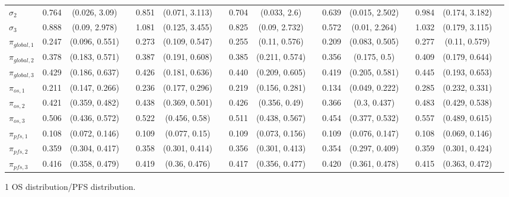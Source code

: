 \documentclass[AMA,STIX1COL]{WileyNJD-v2}
\begin{document}
\begin{landscape}
\begin{center}
\begin{table}[t]
\begin{tabular}{l c c c c c c c c c c c c c c c}
$\sigma_2$ & 0.764 & (0.026, 3.09) &  & 0.851 & (0.071, 3.113) &  & 0.704 & (0.033, 2.6) &  & 0.639 & (0.015, 2.502) &  & 0.984 & (0.174, 3.182) & \\
$\sigma_3$ & 0.888 & (0.09, 2.978) &  & 1.081 & (0.125, 3.455) &  & 0.825 & (0.09, 2.732) &  & 0.572 & (0.01, 2.264) &  & 1.032 & (0.179, 3.115) & \\
$\pi_{global, 1}$ & 0.247 & (0.096, 0.551) &  & 0.273 & (0.109, 0.547) &  & 0.255 & (0.11, 0.576) &  & 0.209 & (0.083, 0.505) &  & 0.277 & (0.11, 0.579) & \\
$\pi_{global, 2}$ & 0.378 & (0.183, 0.571) &  & 0.387 & (0.191, 0.608) &  & 0.385 & (0.211, 0.574) &  & 0.356 & (0.175, 0.5) &  & 0.409 & (0.179, 0.644) & \\
$\pi_{global, 3}$ & 0.429 & (0.186, 0.637) &  & 0.426 & (0.181, 0.636) &  & 0.440 & (0.209, 0.605) &  & 0.419 & (0.205, 0.581) &  & 0.445 & (0.193, 0.653) & \\
$\pi_{os, 1}$ & 0.211 & (0.147, 0.266) &  & 0.236 & (0.177, 0.296) &  & 0.219 & (0.156, 0.281) &  & 0.134 & (0.049, 0.222) &  & 0.285 & (0.232, 0.331) & \\
$\pi_{os, 2}$ & 0.421 & (0.359, 0.482) &  & 0.438 & (0.369, 0.501) &  & 0.426 & (0.356, 0.49) &  & 0.366 & (0.3, 0.437) &  & 0.483 & (0.429, 0.538) & \\
$\pi_{os, 3}$ & 0.506 & (0.436, 0.572) &  & 0.522 & (0.456, 0.58) &  & 0.511 & (0.438, 0.567) &  & 0.454 & (0.377, 0.532) &  & 0.557 & (0.489, 0.615) & \\
$\pi_{pfs, 1}$ & 0.108 & (0.072, 0.146) &  & 0.109 & (0.077, 0.15) &  & 0.109 & (0.073, 0.156) &  & 0.109 & (0.076, 0.147) &  & 0.108 & (0.069, 0.146) & \\
$\pi_{pfs, 2}$ & 0.359 & (0.304, 0.417) &  & 0.358 & (0.301, 0.414) &  & 0.356 & (0.301, 0.413) &  & 0.354 & (0.297, 0.409) &  & 0.359 & (0.301, 0.424) & \\
$\pi_{pfs, 3}$ & 0.416 & (0.358, 0.479) &  & 0.419 & (0.36, 0.476) &  & 0.417 & (0.356, 0.477) &  & 0.420 & (0.361, 0.478) &  & 0.415 & (0.363, 0.472) & \\
\bottomrule
\end{tabular}
\begin{tablenotes}%
\item[1] OS distribution/PFS distribution.
\end{tablenotes}
\end{table}
\end{center}
\end{landscape}
\end{document}
